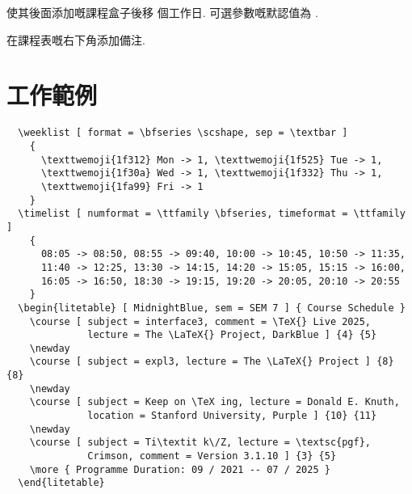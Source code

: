 \documentclass[svgnames, onlydoc]{l3doc}
\begin{document}
\begin{function}{\newday}
  \begin{syntax}
     
  \end{syntax}
  使其後面添加嘅課程盒子後移  個工作日.
  可選參數嘅默認值為 .
\end{function}

\begin{function}{\more}
  \begin{syntax}
     
  \end{syntax}
  在課程表嘅右下角添加備注.
\end{function}

\appendix \linespread{1.05}

\section{工作範例} \label{mwe}

\begin{verbatim}
  \weeklist [ format = \bfseries \scshape, sep = \textbar ]
    {
      \texttwemoji{1f312} Mon -> 1, \texttwemoji{1f525} Tue -> 1,
      \texttwemoji{1f30a} Wed -> 1, \texttwemoji{1f332} Thu -> 1,
      \texttwemoji{1fa99} Fri -> 1
    }
  \timelist [ numformat = \ttfamily \bfseries, timeformat = \ttfamily ]
    {
      08:05 -> 08:50, 08:55 -> 09:40, 10:00 -> 10:45, 10:50 -> 11:35,
      11:40 -> 12:25, 13:30 -> 14:15, 14:20 -> 15:05, 15:15 -> 16:00,
      16:05 -> 16:50, 18:30 -> 19:15, 19:20 -> 20:05, 20:10 -> 20:55
    }
  \begin{litetable} [ MidnightBlue, sem = SEM 7 ] { Course Schedule }
    \course [ subject = interface3, comment = \TeX{} Live 2025,
              lecture = The \LaTeX{} Project, DarkBlue ] {4} {5}
    \newday
    \course [ subject = expl3, lecture = The \LaTeX{} Project ] {8} {8}
    \newday
    \course [ subject = Keep on \TeX ing, lecture = Donald E. Knuth,
              location = Stanford University, Purple ] {10} {11}
    \newday
    \course [ subject = Ti\textit k\/Z, lecture = \textsc{pgf},
              Crimson, comment = Version 3.1.10 ] {3} {5}
    \more { Programme Duration: 09 / 2021 -- 07 / 2025 }
  \end{litetable}  
\end{verbatim}

\PrintIndex
\end{document}
